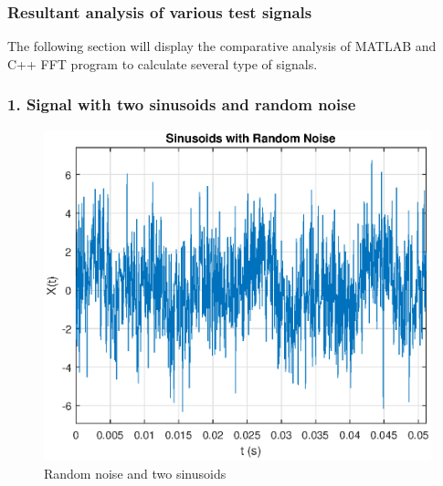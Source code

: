 

\subsubsection{Resultant analysis of various test signals}

The following section will display the comparative analysis of MATLAB and C++ FFT program to calculate several type of signals.

\subsubsection{1. Signal with two sinusoids and random noise}

\begin{figure}[h]
	\centering
	\includegraphics[width=12cm]{./algorithms/fft/figures/random_noise.eps}
	\caption{Random noise and two sinusoids}\label{random_noise}
\end{figure}

